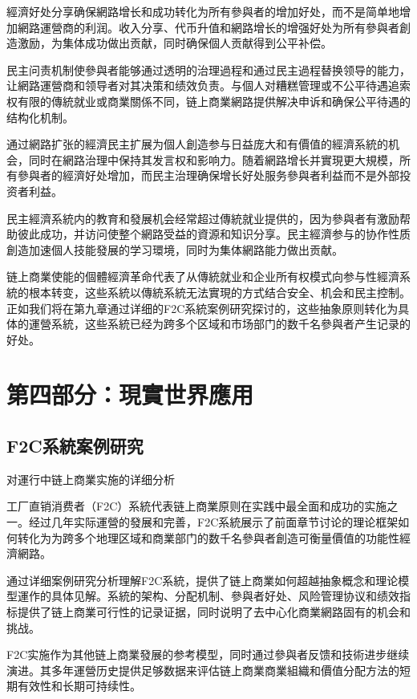 \documentclass[
  Letterpaper,
]{scrbook}
\begin{document}
經濟好处分享确保網路增长和成功转化为所有參與者的增加好处，而不是简单地增加網路運營商的利润。收入分享、代币升值和網路增长的增强好处为所有參與者創造激励，为集体成功做出贡献，同时确保個人贡献得到公平补偿。

民主问责机制使參與者能够通过透明的治理過程和通过民主過程替换领导的能力，让網路運營商和领导者对其决策和绩效负责。与個人对糟糕管理或不公平待遇追索权有限的傳統就业或商業關係不同，链上商業網路提供解决申诉和确保公平待遇的结构化机制。

通过網路扩张的經濟民主扩展为個人創造参与日益庞大和有價值的經濟系統的机会，同时在網路治理中保持其发言权和影响力。随着網路增长并實現更大規模，所有參與者的經濟好处增加，而民主治理确保增长好处服务參與者利益而不是外部投资者利益。

民主經濟系統内的教育和發展机会经常超过傳統就业提供的，因为參與者有激励帮助彼此成功，并访问使整个網路受益的資源和知识分享。民主經濟参与的协作性质創造加速個人技能發展的学习環境，同时为集体網路能力做出贡献。

链上商業使能的個體經濟革命代表了从傳統就业和企业所有权模式向参与性經濟系統的根本转变，这些系統以傳統系統无法實現的方式结合安全、机会和民主控制。正如我们将在第九章通过详细的F2C系統案例研究探讨的，这些抽象原则转化为具体的運營系統，这些系統已经为跨多个区域和市场部门的数千名參與者产生记录的好处。

\part{第四部分：現實世界應用}

\chapter{F2C系統案例研究}\label{sec-f2c-case-study}

对運行中链上商業实施的详细分析

工厂直销消费者（F2C）系統代表链上商業原则在实践中最全面和成功的实施之一。经过几年实际運營的發展和完善，F2C系統展示了前面章节讨论的理论框架如何转化为为跨多个地理区域和商業部门的数千名參與者創造可衡量價值的功能性經濟網路。

通过详细案例研究分析理解F2C系統，提供了链上商業如何超越抽象概念和理论模型運作的具体见解。系統的架构、分配机制、參與者好处、风险管理协议和绩效指标提供了链上商業可行性的记录证据，同时说明了去中心化商業網路固有的机会和挑战。

F2C实施作为其他链上商業發展的参考模型，同时通过參與者反馈和技術进步继续演进。其多年運營历史提供足够数据来评估链上商業商業組織和價值分配方法的短期有效性和长期可持续性。
\end{document}
